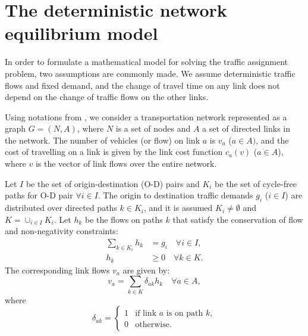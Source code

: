 \section{The deterministic network equilibrium model}
In order to formulate a mathematical model for solving the traffic assignment problem,
two assumptions are commonly made.
We assume deterministic traffic flows and fixed demand,
and the change of travel time on any link does not depend on the change of traffic flows on the other links.

Using notations from \citet{Florian, Florian2008},
we consider a transportation network represented as a graph $G = (N, A)$,
where $N$ is a set of nodes and $A$ a set of directed links in the network.
The number of vehicles (or flow) on link $a$ is $v_a$ ($a \in A)$,
and the cost of travelling on a link is given by the link cost function $c_a(v)$ ($a \in A$),
where $v$ is the vector of link flows over the entire network.

Let $I$ be the set of origin-destination (O-D) pairs
and $K_i$ be the set of cycle-free paths for O-D pair $\forall i \in I$.
The origin to destination traffic demands $g_i$ ($i \in I$) are distributed over directed paths $k \in K_i$,
and it is assumed $K_i \neq \emptyset$ and $K = \cup_{i \in I} K_i$.
Let $h_k$ be the flows on paths $k$ that satisfy the conservation of flow and non-negativity constraints:
\begin{align} \label{eq:ta1}
    \sum_{k \in K_i} h_k & = g_i \quad \forall i \in I, \\
    h_k &\geq 0 \quad \forall k \in K.
\end{align}
The corresponding link flows $v_a$ are given by:
\begin{equation}
    v_a = \sum_{k \in K} \delta_{ak} h_k \quad \forall a \in A,
\end{equation}
where
\begin{equation} \label{eq:ta4}
    \delta_{ak} = 
    \begin{cases}
        1 & \text{if link $a$ is on path $k$},\\
        0 & \text{otherwise}.
    \end{cases}
\end{equation}

